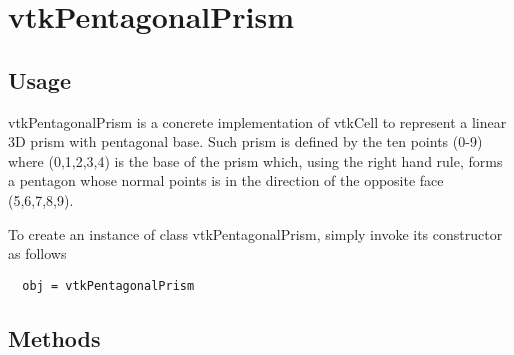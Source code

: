 \section{vtkPentagonalPrism}

\subsection{Usage}

 vtkPentagonalPrism is a concrete implementation of vtkCell to represent a
 linear 3D prism with pentagonal base. Such prism is defined by the ten points (0-9)
 where (0,1,2,3,4) is the base of the prism which, using the right hand
 rule, forms a pentagon whose normal points is in the direction of the
 opposite face (5,6,7,8,9).

To create an instance of class vtkPentagonalPrism, simply
invoke its constructor as follows
\begin{verbatim}
  obj = vtkPentagonalPrism
\end{verbatim}
\subsection{Methods}

